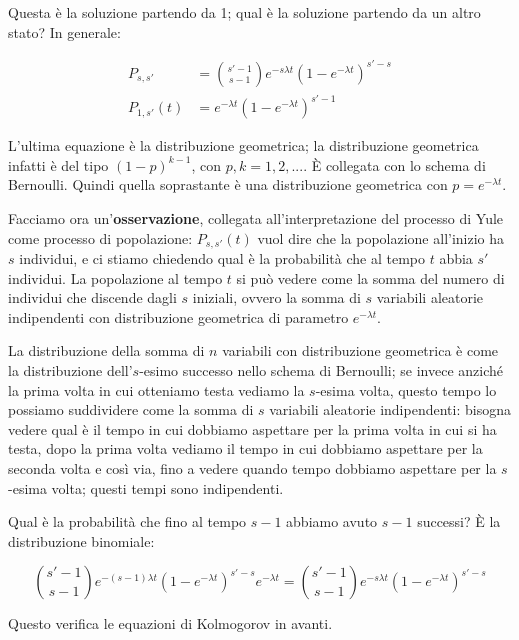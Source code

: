 \documentclass[a4paper,12pt]{book}
\begin{document}
Questa è la soluzione partendo da 1; qual è la soluzione partendo da un altro stato? In generale:

\begin{align*}
	P_{s,s'} & = \binom{s'-1}{s-1}e^{-s\lambda t} (1 - e^{-\lambda t})^{s'-s} \\
	P_{1,s'}(t) & = e^{-\lambda t} (1 - e^{-\lambda t})^{s'-1}
\end{align*}

L'ultima equazione è la distribuzione geometrica; la distribuzione geometrica infatti è del tipo $ (1-p)^{k-1} $, con $ p,k = 1, 2, ... $. È collegata con lo schema di Bernoulli. Quindi quella soprastante è una distribuzione geometrica con $ p = e^{-\lambda t} $.

Facciamo ora un'\textbf{osservazione}, collegata all'interpretazione del processo di Yule come processo di popolazione: $ P_{s,s'}(t) $ vuol dire che la popolazione all'inizio ha $ s $ individui, e ci stiamo chiedendo qual è la probabilità che al tempo $ t $ abbia $ s' $ individui. La popolazione al tempo $ t $ si può vedere come la somma del numero di individui che discende dagli $ s $ iniziali, ovvero la somma di $ s $ variabili aleatorie indipendenti con distribuzione geometrica di parametro $ e^{-\lambda t} $.

La distribuzione della somma di $ n $ variabili con distribuzione geometrica è come la distribuzione dell'$ s $-esimo successo nello schema di Bernoulli; se invece anziché la prima volta in cui otteniamo testa vediamo la $ s $-esima volta, questo tempo lo possiamo suddividere come la somma di $ s $ variabili aleatorie indipendenti: bisogna vedere qual è il tempo in cui dobbiamo aspettare per la prima volta in cui si ha testa, dopo la prima volta vediamo il tempo in cui dobbiamo aspettare per la seconda volta e così via, fino a vedere quando tempo dobbiamo aspettare per la $ s $-esima volta; questi tempi sono indipendenti. 

Qual è la probabilità che fino al tempo $ s-1 $ abbiamo avuto $ s-1 $ successi? È la distribuzione binomiale:

$$ \binom{s'-1}{s-1}e^{-(s-1)\lambda t}(1-e^{-\lambda t})^{s'-s}e^{-\lambda t} = \binom{s'-1}{s-1} e^{-s\lambda t}(1-e^{-\lambda t})^{s'-s}$$

Questo verifica le equazioni di Kolmogorov in avanti. 

\end{document}
